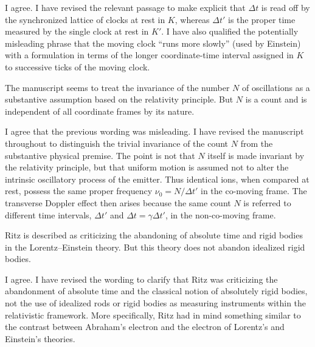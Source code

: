 \documentclass[submitted,11pt]{article}
\begin{document}
\begin{reply}
I agree. I have revised the relevant passage to make explicit that $\Delta t$ is read off by the synchronized lattice of clocks at rest in $K$, whereas $\Delta t'$ is the proper time measured by the single clock at rest in $K'$. I have also qualified the potentially misleading phrase that the moving clock ``runs more slowly'' (used by Einstein) with a formulation in terms of the longer coordinate-time interval assigned in $K$ to successive ticks of the moving clock.
\end{reply}

\begin{point}
The manuscript seems to treat the invariance of the number $N$ of oscillations as a substantive assumption based on the relativity principle. But $N$ is a count and is independent of all coordinate frames by its nature.
\end{point}

\begin{reply}
I agree that the previous wording was misleading. I have revised the manuscript throughout to distinguish the trivial invariance of the count $N$ from the substantive physical premise. The point is not that $N$ itself is made invariant by the relativity principle, but that uniform motion is assumed not to alter the intrinsic oscillatory process of the emitter. Thus identical ions, when compared at rest, possess the same proper frequency $\nu_0=N/\Delta t'$ in the co-moving frame. The transverse Doppler effect then arises because the same count $N$ is referred to different time intervals, $\Delta t'$ and $\Delta t=\gamma\Delta t'$, in the non-co-moving frame.
\end{reply}

\begin{point}
Ritz is described as criticizing the abandoning of absolute time and rigid bodies in the Lorentz--Einstein theory. But this theory does not abandon idealized rigid bodies.
\end{point}

\begin{reply}
I agree. I have revised the wording to clarify that Ritz was criticizing the abandonment of absolute time and the classical notion of absolutely rigid bodies, not the use of idealized rods or rigid bodies as measuring instruments within the relativistic framework. More specifically, Ritz had in mind something similar to the contrast between Abraham's  electron and the  electron of Lorentz's and Einstein's theories.
\end{reply}
\end{document}
